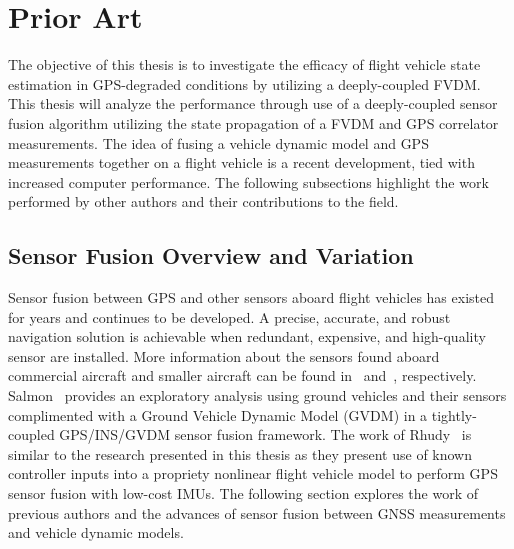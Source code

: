 \section{\textbf{Prior Art}}
The objective of this thesis is to investigate the efficacy of flight vehicle state estimation in GPS-degraded conditions by utilizing a deeply-coupled FVDM\@. This thesis will analyze the performance through use of a deeply-coupled sensor fusion algorithm utilizing the state propagation of a FVDM and GPS correlator measurements. The idea of fusing a vehicle dynamic model and GPS measurements together on a flight vehicle is a recent development, tied with increased computer performance. The following subsections highlight the work performed by other authors and their contributions to the field.
\subsection{\textbf{Sensor Fusion Overview and Variation}}
Sensor fusion between GPS and other sensors aboard flight vehicles has existed for years and continues to be developed. A precise, accurate, and robust navigation solution is achievable when redundant, expensive, and high-quality sensor are installed. More information about the sensors found aboard commercial aircraft and smaller aircraft can be found in~\cite{airbuscustomerservicesAirbusA380Aircraft2020} and~\cite{DiamondAircraftDA401969}, respectively.
Salmon~\cite{salmonExperimentalExplorationLowCost2015} provides an exploratory analysis using ground vehicles and their sensors complimented with a Ground Vehicle Dynamic Model (GVDM) in a tightly-coupled GPS/INS/GVDM sensor fusion framework. The work of Rhudy~\cite{rhudyDynamicModelaidedSensor2017} is similar to the research presented in this thesis as they present use of known controller inputs into a propriety nonlinear flight vehicle model to perform GPS sensor fusion with low-cost IMUs. The following section explores the work of previous authors and the advances of sensor fusion between GNSS measurements and vehicle dynamic models.

